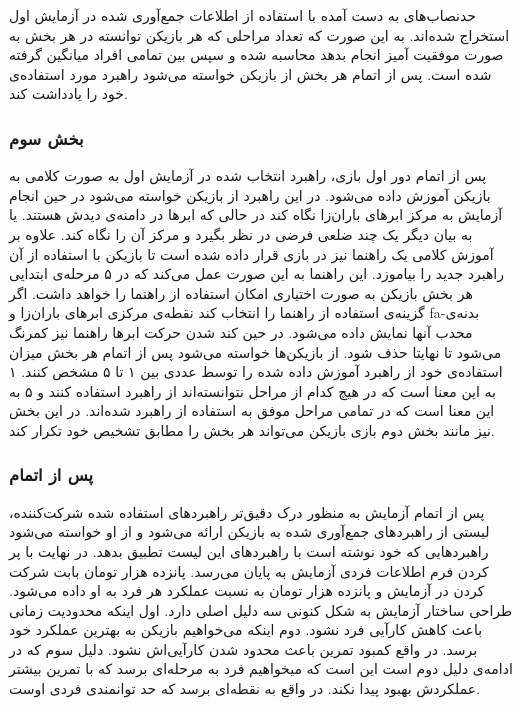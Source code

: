 \documentclass[twoside, a4paper,11pt]{book}
\numberwithin{equation}{chapter}
\numberwithin{table}{chapter}
\numberwithin{figure}{chapter}
\numberwithin{equation}{chapter}
\newcommand{\mls}[1]{\gls{fa-#1}\glsuseri{la-#1}}
\begin{document}
حدنصاب‌های به دست آمده با استفاده از اطلاعات جمع‌آوری شده در آزمایش اول استخراج شده‌اند. به این صورت که تعداد مراحلی که هر بازیکن توانسته در هر بخش به صورت موفقیت آمیز انجام بدهد محاسبه شده و سپس بین تمامی افراد میانگین گرفته شده است. پس از اتمام هر بخش از بازیکن خواسته می‌شود راهبرد مورد استفاده‌ی خود را یادداشت کند.  

\subsubsection{بخش سوم} \label{partTwoMainTest:three}

پس از اتمام دور اول بازی، راهبرد انتخاب شده در آزمایش اول به صورت کلامی به بازیکن آموزش داده می‌شود. در این راهبرد از بازیکن خواسته می‌شود در حین انجام آزمایش به مرکز ابرهای باران‌زا نگاه کند در حالی که ابرها در دامنه‌ی دیدش هستند. یا به بیان دیگر یک چند ضلعی فرضی در نظر بگیرد و مرکز آن را نگاه کند. علاوه بر آموزش کلامی یک راهنما نیز در بازی قرار داده شده است تا بازیکن با استفاده از آن راهبرد جدید را بیاموزد. این راهنما به این صورت عمل می‌کند که در ۵ مرحله‌ی ابتدایی هر بخش بازیکن به صورت اختیاری امکان استفاده از راهنما را خواهد داشت. اگر گزینه‌ی استفاده از راهنما را انتخاب کند نقطه‌ی مرکزی ابرهای باران‌زا و \mls{بدنه‌ی محدب} آنها نمایش داده می‌شود. در حین کند شدن حرکت ابرها راهنما نیز کمرنگ می‌شود تا نهایتا حذف شود. از بازیکن‌ها خواسته می‌شود پس از اتمام هر بخش میزان استفاده‌ی خود از راهبرد آموزش داده شده را توسط عددی بین ۱ تا ۵ مشخص کنند. ۱ به این معنا است که در هیچ کدام از مراحل نتوانسته‌اند از راهبرد استفاده کنند و ۵ به این معنا است که در تمامی مراحل موفق به استفاده از راهبرد شده‌اند. در این بخش نیز مانند بخش دوم بازی بازیکن می‌تواند هر بخش را مطابق تشخیص خود تکرار کند.

\subsubsection{پس از اتمام}

پس از اتمام آزمایش به منظور درک دقیق‌تر راهبردهای استفاده شده شرکت‌کننده، لیستی از راهبردهای جمع‌آوری شده به بازیکن ارائه می‌شود و از او خواسته می‌شود راهبردهایی که خود نوشته است با راهبردهای این لیست تطبیق بدهد. در نهایت با پر کردن فرم اطلاعات فردی آزمایش به پایان می‌رسد. پانزده هزار تومان بابت شرکت کردن در آزمایش و پانزده هزار تومان به نسبت عملکرد هر فرد به او داده می‌شود.
طراحی ساختار آزمایش به شکل کنونی سه دلیل اصلی دارد. اول اینکه محدودیت زمانی باعث کاهش کارآیی فرد نشود. دوم اینکه می‌خواهیم بازیکن به بهترین عملکرد خود برسد. در واقع کمبود تمرین باعث محدود شدن کارآیی‌اش نشود. دلیل سوم که در ادامه‌ی دلیل دوم است این است که میخواهیم فرد به مرحله‌ای برسد که با تمرین بیشتر عملکردش بهبود پیدا نکند. در واقع به نقطه‌ای برسد که حد توانمندی فردی اوست.
\end{document}

